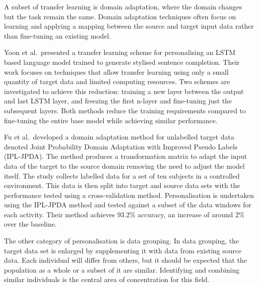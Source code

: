 A subset of transfer learning is domain adaptation, where the domain changes but the task remain the same\cite{Goodfellow2015}. Domain adaptation techniques often focus on learning and applying a mapping between the source and target input data rather than fine-tuning an existing model.

Yoon et al.~presented a transfer learning scheme for personalising an LSTM based language model trained to generate stylised sentence completion. Their work focuses on techniques that allow transfer learning using only a small quantity of target data and limited computing resources. Two schemes are investigated to achieve this reduction: training a new layer between the output and last LSTM layer, and freezing the first n-layer and fine-tuning just the subsequent layers. Both methods reduce the training requirements compared to fine-tuning the entire base model while achieving similar performance.\cite{Yoon2017}

Fu et al.~developed a domain adaptation method for unlabelled target data denoted Joint Probability Domain Adaptation with Improved Pseudo Labels (IPL-JPDA). The method produces a transformation matrix to adapt the input data of the target to the source domain removing the need to adjust the model itself. The study collects labelled data for a set of ten subjects in a controlled environment. This data is then split into target and source data sets with the performance tested using a cross-validation method. Personalisation is undertaken using the IPL-JPDA method and tested against a subset of the data windows for each activity. Their method achieves $93.2\%$ accuracy, an increase of around $2\%$ over the baseline.\cite{Fu2021}


The other category of personalisation is data grouping. In data grouping, the target data set is enlarged by supplementing it with data from existing source data. Each individual will differ from others, but it should be expected that the population as a whole or a subset of it are similar\cite{Schneider2021, Nguyen2021}. Identifying and combining similar individuals is the central area of concentration for this field.

